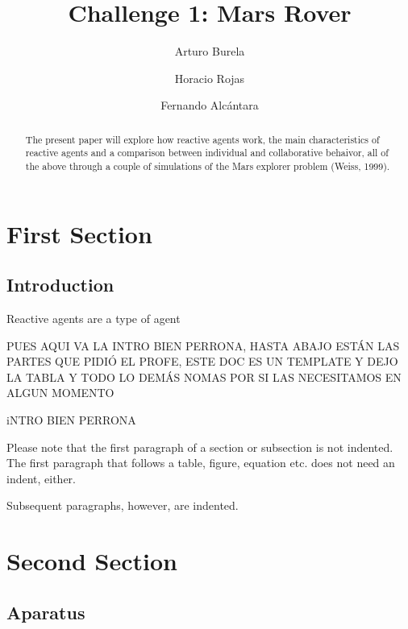 \documentclass[runningheads]{llncs}
\begin{document}
%
\title{Challenge 1: Mars Rover}
%
%
\author{Arturo Burela \and
Horacio Rojas \and
Fernando Alcántara}
%
%
%
\maketitle              %
%
\begin{abstract}
The present paper will explore how reactive agents work, the main characteristics of reactive agents and a comparison between individual and collaborative behaivor,
all of the above through a couple of simulations of the Mars explorer problem (Weiss, 1999).

\end{abstract}
%
%
%
\section{First Section}
\subsection{Introduction}

Reactive agents are a type of agent 


PUES AQUI VA LA INTRO BIEN PERRONA, HASTA ABAJO ESTÁN LAS PARTES QUE PIDIÓ EL PROFE, ESTE DOC ES UN TEMPLATE Y 
DEJO LA TABLA Y TODO LO DEMÁS NOMAS POR SI LAS NECESITAMOS EN ALGUN MOMENTO

iNTRO BIEN PERRONA


Please note that the first paragraph of a section or subsection is
not indented. The first paragraph that follows a table, figure,
equation etc. does not need an indent, either.

Subsequent paragraphs, however, are indented.


\section{Second Section}
\subsection{Aparatus}
\end{document}
